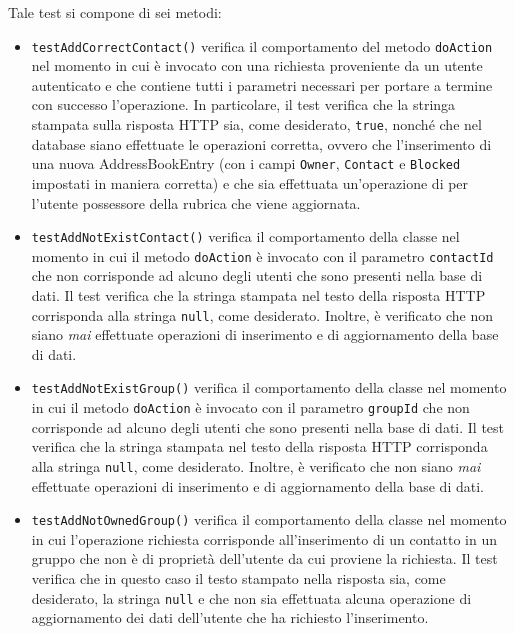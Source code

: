 \begin{itemize}
Tale test si compone di sei metodi: 
\begin{itemize}

\item \texttt{testAddCorrectContact()} verifica il comportamento del metodo \texttt{doAction} nel momento in cui è invocato con una richiesta proveniente da un utente autenticato e che contiene tutti i parametri necessari per portare a termine con successo l'operazione. In particolare, il test verifica che la stringa stampata sulla risposta HTTP sia, come desiderato, \texttt{true}, nonché che nel database siano effettuate le operazioni corretta, ovvero che l'inserimento di una nuova AddressBookEntry (con i campi \texttt{Owner}, \texttt{Contact} e \texttt{Blocked} impostati in maniera corretta) e che sia effettuata un'operazione di  per l'utente possessore della rubrica che viene aggiornata.

\item \texttt{testAddNotExistContact()} verifica il comportamento della classe nel momento in cui il metodo \texttt{doAction} è invocato con il parametro \texttt{contactId} che non corrisponde ad alcuno degli utenti che sono presenti nella base di dati. Il test verifica che la stringa stampata nel testo della risposta HTTP corrisponda alla stringa \texttt{null}, come desiderato. Inoltre, è verificato che non siano \textit{mai} effettuate operazioni di inserimento e di aggiornamento della base di dati.

\item \texttt{testAddNotExistGroup()} verifica il comportamento della classe nel momento in cui il metodo \texttt{doAction} è invocato con il parametro \texttt{groupId} che non corrisponde ad alcuno degli utenti che sono presenti nella base di dati. Il test verifica che la stringa stampata nel testo della risposta HTTP corrisponda alla stringa \texttt{null}, come desiderato. Inoltre, è verificato che non siano \textit{mai} effettuate operazioni di inserimento e di aggiornamento della base di dati.

\item \texttt{testAddNotOwnedGroup()} verifica il comportamento della classe nel momento in cui l'operazione richiesta corrisponde all'inserimento di un contatto in un gruppo che non è di proprietà dell'utente da cui proviene la richiesta. Il test verifica che in questo caso il testo stampato nella risposta sia, come desiderato, la stringa \texttt{null} e che non sia effettuata alcuna operazione di aggiornamento dei dati dell'utente che ha richiesto l'inserimento.


\end{itemize}
\end{itemize}
